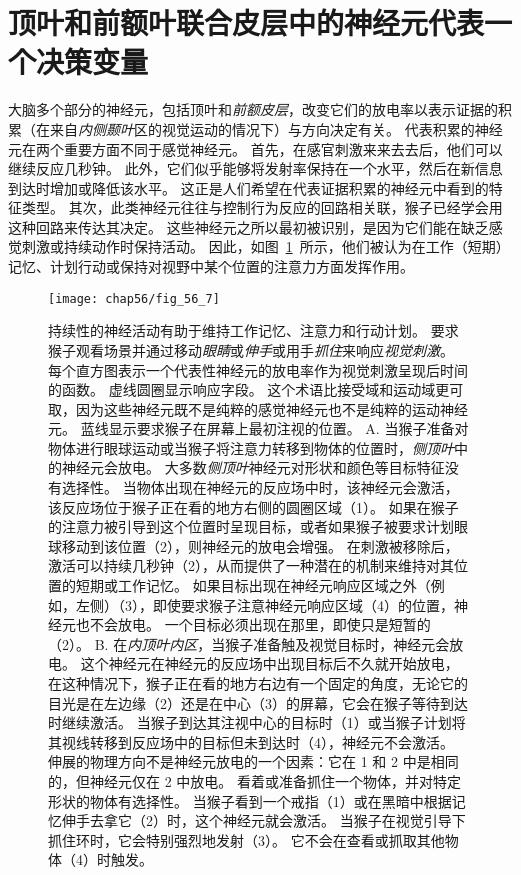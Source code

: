 \section{顶叶和前额叶联合皮层中的神经元代表一个决策变量}

大脑多个部分的神经元，包括顶叶和\textit{前额皮层}，改变它们的放电率以表示证据的积累（在来自\textit{内侧颞叶}区的视觉运动的情况下）与方向决定有关。
代表积累的神经元在两个重要方面不同于感觉神经元。
首先，在感官刺激来来去去后，他们可以继续反应几秒钟。
此外，它们似乎能够将发射率保持在一个水平，然后在新信息到达时增加或降低该水平。
这正是人们希望在代表证据积累的神经元中看到的特征类型。
其次，此类神经元往往与控制行为反应的回路相关联，猴子已经学会用这种回路来传达其决定。
这些神经元之所以最初被识别，是因为它们能在缺乏感觉刺激或持续动作时保持活动。
因此，如图~\ref{fig:56_7}~所示，他们被认为在工作（短期）记忆、计划行动或保持对视野中某个位置的注意力方面发挥作用。


\begin{figure}[htbp]
	\centering
	\texttt{[image: chap56/fig\_56\_7]}
	\caption{持续性的神经活动有助于维持工作记忆、注意力和行动计划。
		要求猴子观看场景并通过移动\textit{眼睛}或\textit{伸手}或用手\textit{抓住}来响应\textit{视觉刺激}。
		每个直方图表示一个代表性神经元的放电率作为视觉刺激呈现后时间的函数。
		虚线圆圈显示响应字段。
		这个术语比接受域和运动域更可取，因为这些神经元既不是纯粹的感觉神经元也不是纯粹的运动神经元。
		蓝线显示要求猴子在屏幕上最初注视的位置。
		A. 当猴子准备对物体进行眼球运动或当猴子将注意力转移到物体的位置时，\textit{侧顶叶}中的神经元会放电。
		大多数\textit{侧顶叶}神经元对形状和颜色等目标特征没有选择性。
		当物体出现在神经元的反应场中时，该神经元会激活，该反应场位于猴子正在看的地方右侧的圆圈区域（1）。
		如果在猴子的注意力被引导到这个位置时呈现目标，或者如果猴子被要求计划眼球移动到该位置（2），则神经元的放电会增强。
		在刺激被移除后，激活可以持续几秒钟（2），从而提供了一种潜在的机制来维持对其位置的短期或工作记忆。
		如果目标出现在神经元响应区域之外（例如，左侧）（3），即使要求猴子注意神经元响应区域（4）的位置，神经元也不会放电。
		一个目标必须出现在那里，即使只是短暂的（2）。
		B. 在\textit{内顶叶内区}，当猴子准备触及视觉目标时，神经元会放电。
		这个神经元在神经元的反应场中出现目标后不久就开始放电，在这种情况下，猴子正在看的地方右边有一个固定的角度，无论它的目光是在左边缘（2）还是在中心（3）的屏幕，它会在猴子等待到达时继续激活。
		当猴子到达其注视中心的目标时（1）或当猴子计划将其视线转移到反应场中的目标但未到达时（4），神经元不会激活。
		伸展的物理方向不是神经元放电的一个因素：它在 1 和 2 中是相同的，但神经元仅在 2 中放电。
		看着或准备抓住一个物体，并对特定形状的物体有选择性。
		当猴子看到一个戒指（1）或在黑暗中根据记忆伸手去拿它（2）时，这个神经元就会激活。
		当猴子在视觉引导下抓住环时，它会特别强烈地发射（3）。
		它不会在查看或抓取其他物体（4）时触发。}
	\label{fig:56_7}
\end{figure}


